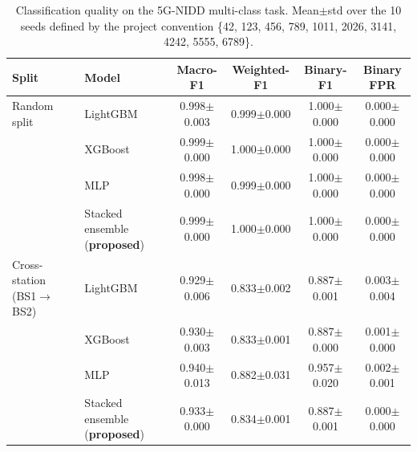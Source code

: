 \begin{table}[!t]
\centering
\caption{Classification quality on the 5G-NIDD multi-class task. Mean$\pm$std over the 10 seeds defined by the project convention \{42, 123, 456, 789, 1011, 2026, 3141, 4242, 5555, 6789\}.}
\label{tab:main}
\begin{tabular}{llcccc}
\toprule
Split & Model & Macro-F1 & Weighted-F1 & Binary-F1 & Binary FPR \\
\midrule
Random split & LightGBM & 0.998$\pm$0.003 & 0.999$\pm$0.000 & 1.000$\pm$0.000 & 0.000$\pm$0.000 \\
 & XGBoost & 0.999$\pm$0.000 & 1.000$\pm$0.000 & 1.000$\pm$0.000 & 0.000$\pm$0.000 \\
 & MLP & 0.998$\pm$0.000 & 0.999$\pm$0.000 & 1.000$\pm$0.000 & 0.000$\pm$0.000 \\
 & Stacked ensemble (\textbf{proposed}) & 0.999$\pm$0.000 & 1.000$\pm$0.000 & 1.000$\pm$0.000 & 0.000$\pm$0.000 \\
\midrule
Cross-station (BS1$\rightarrow$BS2) & LightGBM & 0.929$\pm$0.006 & 0.833$\pm$0.002 & 0.887$\pm$0.001 & 0.003$\pm$0.004 \\
 & XGBoost & 0.930$\pm$0.003 & 0.833$\pm$0.001 & 0.887$\pm$0.000 & 0.001$\pm$0.000 \\
 & MLP & 0.940$\pm$0.013 & 0.882$\pm$0.031 & 0.957$\pm$0.020 & 0.002$\pm$0.001 \\
 & Stacked ensemble (\textbf{proposed}) & 0.933$\pm$0.000 & 0.834$\pm$0.001 & 0.887$\pm$0.001 & 0.000$\pm$0.000 \\
\bottomrule
\end{tabular}
\end{table}